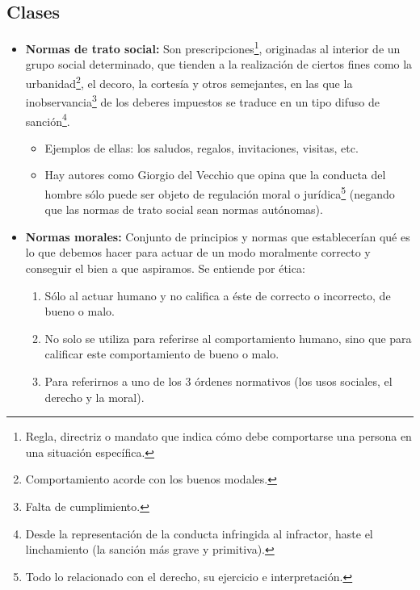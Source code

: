 \documentclass{templateApunte}
\begin{document}
\subsection{Clases}
\begin{itemize}
  \item \textbf{Normas de trato social:} Son prescripciones\footnote{Regla, directriz o mandato que indica cómo debe comportarse una persona en una situación específica.}, originadas al interior de un grupo social determinado, que tienden a la realización de ciertos fines como la urbanidad\footnote{Comportamiento acorde con los buenos modales.}, el decoro, la cortesía y otros semejantes, en las que la inobservancia\footnote{Falta de cumplimiento.} de los deberes impuestos se traduce en un tipo difuso de sanción\footnote{Desde la representación de la conducta infringida al infractor, haste el linchamiento (la sanción más grave y primitiva).}.
  \begin{itemize}
    \item Ejemplos de ellas: los saludos, regalos, invitaciones, visitas, etc.
    \item Hay autores como Giorgio del Vecchio que opina que la conducta del hombre sólo puede ser objeto de regulación moral o jurídica\footnote{Todo lo relacionado con el derecho, su ejercicio e interpretación.} (negando que las normas de trato social sean normas autónomas).
  \end{itemize}

  \item \textbf{Normas morales:} Conjunto de principios y normas que establecerían qué es lo que debemos hacer para actuar de un modo moralmente correcto y conseguir el bien a que aspiramos.
  \newline
  Se entiende por ética:
  \begin{enumerate}
    \item Sólo al actuar humano y no califica a éste de correcto o incorrecto, de bueno o malo.
    \item No solo se utiliza para referirse al comportamiento humano, sino que para calificar este comportamiento de bueno o malo.
    \item Para referirnos a uno de los 3 órdenes normativos (los usos sociales, el derecho y la moral). 
  \end{enumerate}


\end{itemize}
\end{document}
